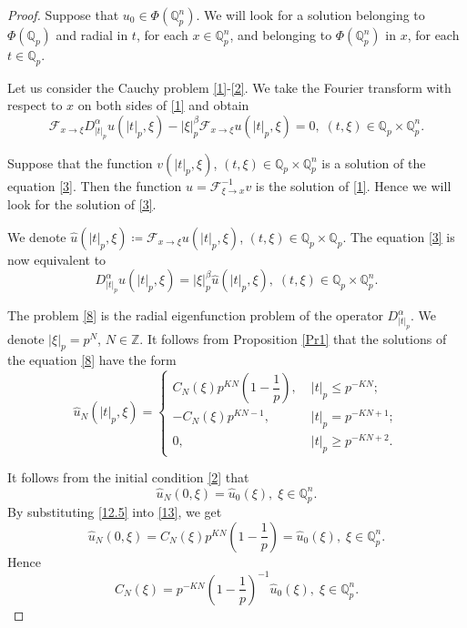 \documentclass[14pt]{article}
\theoremstyle{theorem}
\theoremstyle{theorem}
\theoremstyle{definition}
\theoremstyle{lemma}
\newcommand{\Label}[1]{\label{#1}}
\numberwithin{equation}{section}
\begin{document}
\begin{proof}
Suppose that $u_0\in\Phi(\mathbb{Q}_p^n)$. We will look for a solution belonging to $\Phi(\mathbb{Q}_p)$ and radial in $t$, for each $x\in\mathbb{Q}_p^n$, and belonging to $\Phi(\mathbb{Q}_p^n)$ in $x$, for each $t\in\mathbb{Q}_p$.

Let us consider the Cauchy problem \eqref{1}-\eqref{2}. We take the Fourier transform with respect to $x$ on both sides of \eqref{1} and obtain
\begin{equation}\Label{3}
\mathcal{F}_{x\to \xi}D^{\alpha}_{|t|_p}u(|t|_p,\xi)-|\xi|_p^{\beta}\mathcal{F}_{x\to\xi}u(|t|_p,\xi)=0,\;(t,\xi)\in\mathbb{Q}_p\times\mathbb{Q}_p^n.
\end{equation}

Suppose that the function $v(|t|_p,\xi)$, $(t,\xi)\in\mathbb{Q}_p\times\mathbb{Q}_p^n$ is a solution of the equation \eqref{3}. Then the function $u=\mathcal{F}_{\xi\to x}^{-1}v$ is the solution of \eqref{1}. Hence we will look for the solution of \eqref{3}.

We denote $\hat{u}(|t|_p,\xi)\coloneqq\mathcal{F}_{x\to\xi}u(|t|_p,\xi)$, $(t,\xi)\in\mathbb{Q}_p\times\mathbb{Q}_p$. The equation \eqref{3} is now equivalent to
\begin{equation}\Label{8}
D_{|t|_p}^{\alpha}\hat{u}(|t|_p,\xi)=|\xi|_p^{\beta}\hat{u}(|t|_p,\xi),\;(t,\xi)\in\mathbb{Q}_p\times\mathbb{Q}_p^n.
\end{equation}

The problem \eqref{8} is the radial eigenfunction problem of the operator $D_{|t|_p}^{\alpha}$. We denote $|\xi|_p=p^N$, $N\in\mathbb{Z}$. It follows from Proposition \ref{Pr1} that the solutions of the equation \eqref{8} have the form
\begin{equation}\Label{12.5}
\hat{u}_N(|t|_p,\xi)=\left\{
\begin{array}{ll}
C_N(\xi)p^{KN}(1-\dfrac{1}{p}),\;&|t|_p\leq p^{-KN};\\
-C_N(\xi)p^{KN-1},\;&|t|_p=p^{-KN+1};\\
0,\;&|t|_p\geq p^{-KN+2}.
\end{array}
\right.
\end{equation}

It follows from the initial condition \eqref{2} that
\begin{equation}\Label{13}
\hat{u}_N(0,\xi)=\hat{u}_0(\xi),\;\xi\in\mathbb{Q}_p^n.
\end{equation}
By substituting \eqref{12.5} into \eqref{13}, we get
$$\hat{u}_N(0,\xi)=C_N(\xi)p^{KN}(1-\frac{1}{p})=\hat{u}_0(\xi),\;\xi\in\mathbb{Q}_p^n.$$
Hence
$$C_N(\xi)=p^{-KN}(1-\frac{1}{p})^{-1}\hat{u}_0(\xi),\;\xi\in\mathbb{Q}_p^n.$$


\end{proof}
\end{document}
